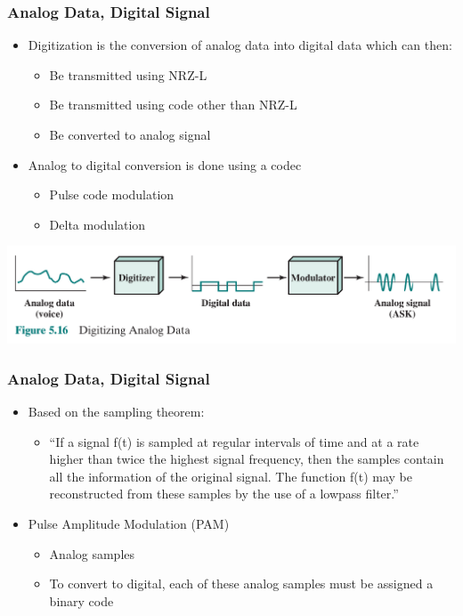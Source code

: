 \documentclass[pdflatex,compress]{beamer}
\begin{document}
\begin{frame}
	\frametitle{Analog Data, Digital Signal}
	\begin{itemize}
		\item Digitization is the conversion of analog data into digital data which can then:
		\begin{itemize}
			\item Be transmitted using NRZ-L
			\item Be transmitted using code other than NRZ-L
			\item Be converted to analog signal
		\end{itemize}
		\item Analog to digital conversion is done using a codec
		\begin{itemize}
			\item Pulse code modulation
			\item Delta modulation
		\end{itemize}
	\end{itemize}
\end{frame}

\begin{frame}
	\begin{center}
		\includegraphics[width=\linewidth]{img/img23}
	\end{center}
\end{frame}

\begin{frame}
	\frametitle{Analog Data, Digital Signal}
	\begin{itemize}
		\item Based on the sampling theorem:
		\begin{itemize}
			\item “If a signal f(t) is sampled at regular intervals of time and at a rate higher than twice the highest signal frequency, then the samples contain all the information of the original signal. The function f(t) may be reconstructed from these samples by the use of a lowpass filter.”
		\end{itemize}
		\item Pulse Amplitude Modulation (PAM)
		\begin{itemize}
			\item Analog samples
			\item To convert to digital, each of these analog samples must be assigned a binary code
		\end{itemize}
	\end{itemize}
\end{frame}
\end{document}
